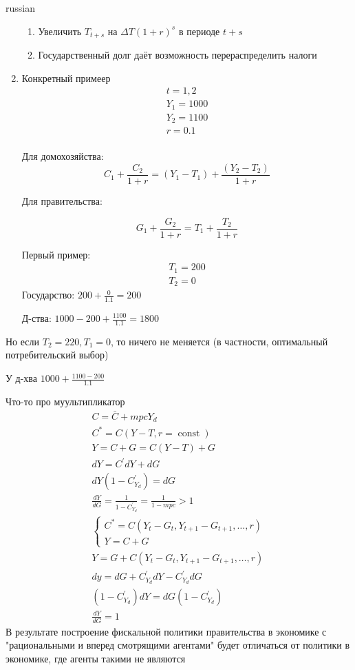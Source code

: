 \documentclass{article}
\begin{document}
\begin{otherlanguage*}{russian}
\begin{enumerate}
\begin{enumerate}
\item Увеличить $ T_{t + s} $ на $ \Delta T (1 + r)^s $ в периоде $ t + s $

\item Государственный долг даёт возможность перераспределить налоги  
\end{enumerate}
\item Конкретный примеер
\begin{align}
t = 1, 2 \\
Y_1 = 1000 \\ 
Y_2 = 1100 \\
r = 0.1 \\
\end{align}

Для домохозяйства: 
\begin{equation}
C_1 + \frac{C_2}{1 + r}  = (Y_1 - T_1) + \frac{(Y_2 - T_2)}{1 + r}
\end{equation}

Для правительства: 

\begin{equation}
G_1 + \frac{G_2}{1 + r}  = T_1 + \frac{T_2}{1 + r} 
\end{equation}

Первый пример:
\begin{align}
T_1 = 200 \\
T_2 = 0
\end{align}
Государство: $ 200 + \frac{0}{1.1} = 200 $

Д-ства: $ 1000 - 200 + \frac{1100}{1.1} = 1800 $  
\end{enumerate}
Но если $ T_2 = 220, T_1 = 0$, то ничего не меняется (в частности, оптимальный потребительский выбор)

У д-хва $ 1000 + \frac{1100 -200}{1.1} $

Что-то про муультипликатор
\begin{align}
C = \bar{C} + mpc Y_d \\ 
C^* = C(Y - T, r=\operatorname{const}) \\
Y = C + G = C(Y - T) + G \\
dY = C^{'} dY + dG \\ 
dY ( 1 - C^{'}_{Y_d}) = dG  \\
\frac{dY}{dG} = \frac{1}{1 - C^{'}_{Y_d}} = \frac{1}{1 - mpc} > 1 \\
\begin{cases}
C^* = C(Y_t - G_t, Y_{t+1} - G_{t+1}, \ldots, r) \\
Y = C + G 
\end{cases}\\
Y = G + C (Y_t - G_t, Y_{t+1} - G_{t+1}, \ldots, r)  \\
dy = dG + C^{'}_{Y_d} dY - C^{'}_{Y_d} dG \\
(1 - C^{'}_{Y_d}) dY = dG ( 1 - C^{'}_{Y_d}) \\
\frac{dY}{dG} = 1
\end{align}
В результате построение фискальной политики правительства в экономике с "рациональными и вперед смотрящими агентами" будет отличаться от политики в экономике, где агенты такими не являются


\end{otherlanguage*}
\end{document}
